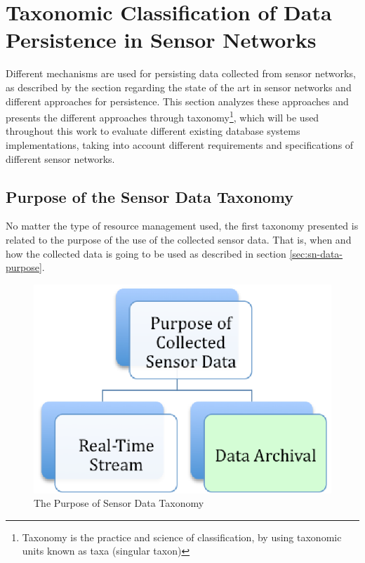 

\chapter{Taxonomic Classification of Data Persistence in Sensor Networks}
\label{chap:taxonomies}

Different mechanisms are used for persisting data collected from sensor
networks, as described by the section regarding the state of the art in sensor
networks and different approaches for persistence. This section analyzes these
approaches and presents the different approaches through 
taxonomy\footnote{Taxonomy is the practice and science of classification, by
using taxonomic units known as taxa (singular taxon)}, which will be used
throughout this work to evaluate different existing database systems
implementations, taking into account different requirements and specifications
of different sensor networks.

\section{Purpose of the Sensor Data Taxonomy}

No matter the type of resource management used, the first taxonomy presented is
related to the purpose of the use of the collected sensor data. That is, when
and how the collected data is going to be used as described in section
\ref{sec:sn-data-purpose}.

\begin{figure}[h]
  \centering
  \includegraphics{../diagrams/taxonomy-data-purpose}
  \caption{The Purpose of Sensor Data Taxonomy}
  \label{fig:taxonomy-data-purpose}
\end{figure}

